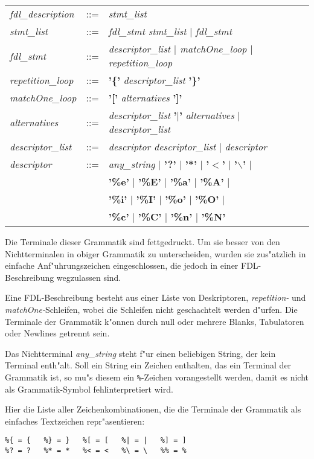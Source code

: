 \begin{tabular}[t]{lll}
{\it fdl\_description} & ::= & {\it stmt\_list} \\
{\it stmt\_list} & ::= & {\it fdl\_stmt stmt\_list} $|$ {\it fdl\_stmt} \\
{\it fdl\_stmt} & ::= & {\it descriptor\_list $|$ matchOne\_loop $|$
repetition\_loop} \\
{\it repetition\_loop} & ::= & {\bf '\{'} {\it descriptor\_list} {\bf '\}'} \\
{\it matchOne\_loop} & ::= & {\bf '['} {\it alternatives} {\bf ']'} \\
{\it alternatives} & ::= & {\it descriptor\_list} {\bf '$|$'} 
            {\it alternatives} $|$ {\it descriptor\_list} \\
{\it descriptor\_list} & ::= & {\it descriptor descriptor\_list} $|$
            {\it descriptor} \\
{\it descriptor} & ::= & {\it any\_string} $|$ {\bf '?'} $|$ {\bf '*'} $|$
            {\bf '$<$'} $|$ {\bf '$\backslash$'} $|$ \\ 
& &         {\bf '\%e'} $|$ {\bf '\%E'} $|$ {\bf '\%a'} $|$ {\bf '\%A'} $|$ \\
& &         {\bf '\%i'} $|$ {\bf '\%I'} $|$ {\bf '\%o'} $|$ {\bf '\%O'} $|$ \\
& &         {\bf '\%c'} $|$ {\bf '\%C'} $|$ {\bf '\%n'} $|$ {\bf '\%N'}
\end{tabular}
       
Die Terminale dieser Grammatik sind fettgedruckt.
Um sie besser von den Nichtterminalen in obiger Grammatik zu unterscheiden,
wurden sie zus"atzlich in einfache Anf"uhrungszeichen eingeschlossen, die
jedoch in einer FDL-Beschreibung wegzulassen sind.

\begin{sloppypar}
Eine FDL-Beschreibung besteht aus einer Liste von Deskriptoren, 
{\it repetition-} und {\it matchOne-}Schleifen, wobei die Schleifen
nicht geschachtelt werden d"urfen.
Die Terminale der Grammatik k"onnen durch null oder mehrere Blanks, 
Tabulatoren oder Newlines getrennt sein.
\end{sloppypar}

Das Nichtterminal {\it any\_string} steht f"ur einen beliebigen String,
der kein Terminal enth"alt.
Soll ein String ein Zeichen enthalten, das ein Terminal der Grammatik
ist, so mu"s diesem ein {\tt \%}-Zeichen vorangestellt werden, damit es nicht
als Grammatik-Symbol fehlinterpretiert wird.

\begin{samepage} Hier die Liste aller Zeichenkombinationen, 
die die Terminale der Grammatik als einfaches Textzeichen repr"asentieren:
\begin{verbatim}
%{ = {   %} = }   %[ = [   %| = |   %] = ] 
%? = ?   %* = *   %< = <   %\ = \   %% = % 
\end{verbatim}    
\end{samepage}

